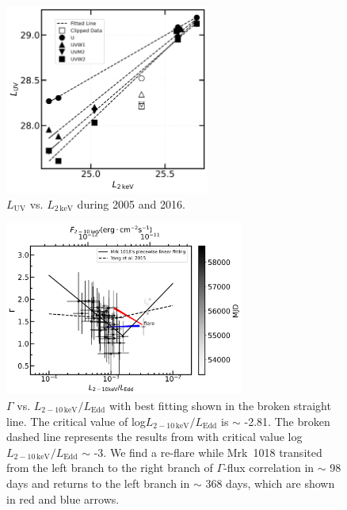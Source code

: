 \documentclass[twocolumn]{aastex63}
\begin{document}
\begin{figure}
\centering
	\includegraphics[width=0.6\textwidth]{./pic/Mrk1018_L2_Luvot_correlation-fig-without-outlier_clip.png}
    \caption{$L_\mathrm{UV}$ vs. $L_\mathrm{2\,keV}$ during 2005 and 2016.}
    \label{fig:correlation-Luvot-L2keV}
\end{figure}


\begin{figure}
\centering
	\includegraphics[width=0.7\textwidth]{./pic/xrayappendgood-errorbar-Lrate-g-tmap.png}
    \caption{$\Gamma$ vs. $L_\mathrm{2-10\,keV}/L_\mathrm{Edd}$ with best fitting shown in the broken straight line. The critical value of log$L_\mathrm{2-10\,keV}/L_\mathrm{Edd}$ is $\sim$ -2.81. The broken dashed line represents the results from \citet{2015MNRAS.447.1692Y} with critical value log$L_\mathrm{2-10\,keV}/L_\mathrm{Edd}$ $\sim$ -3. We find a re-flare while Mrk~1018 transited from the left branch to the right branch of $\Gamma$-flux correlation in $\sim$ 98 days and returns to the left branch in $\sim$ 368 days, which are shown in red and blue arrows.}
    \label{fig:xrayappendgood-Lrateandg-tmap}
\end{figure}
\end{document}
